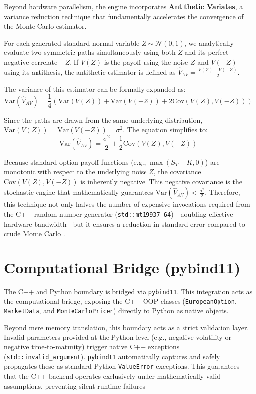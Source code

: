 Beyond hardware parallelism, the engine incorporates \textbf{Antithetic Variates}, a variance reduction technique that fundamentally accelerates the convergence of the Monte Carlo estimator.

For each generated standard normal variable \(Z \sim \mathcal{N}(0,1)\), we analytically evaluate two symmetric paths simultaneously using both \(Z\) and its perfect negative correlate \(-Z\). If \(V(Z)\) is the payoff using the noise \(Z\) and \(V(-Z)\) using its antithesis, the antithetic estimator is defined as \(\hat{V}_{AV} = \frac{V(Z) + V(-Z)}{2}\).

The variance of this estimator can be formally expanded as:
\begin{equation}
\text{Var}(\hat{V}_{AV}) = \frac{1}{4} \left( \text{Var}(V(Z)) + \text{Var}(V(-Z)) + 2\text{Cov}(V(Z), V(-Z)) \right)
\end{equation}

Since the paths are drawn from the same underlying distribution, \(\text{Var}(V(Z)) = \text{Var}(V(-Z)) = \sigma^2\). The equation simplifies to:
\begin{equation}
\text{Var}(\hat{V}_{AV}) = \frac{\sigma^2}{2} + \frac{1}{2}\text{Cov}(V(Z), V(-Z))
\end{equation}

Because standard option payoff functions (e.g., \(\max(S_T - K, 0)\)) are monotonic with respect to the underlying noise \(Z\), the covariance \(\text{Cov}(V(Z), V(-Z))\) is inherently negative. This negative covariance is the stochastic engine that mathematically guarantees \(\text{Var}(\hat{V}_{AV}) < \frac{\sigma^2}{2}\). Therefore, this technique not only halves the number of expensive invocations required from the C++ random number generator (\texttt{std::mt19937\_64})---doubling effective hardware bandwidth---but it ensures a reduction in standard error compared to crude Monte Carlo \cite{glasserman2004monte}.

\section{Computational Bridge (pybind11)}

The C++ and Python boundary is bridged via \texttt{pybind11}. This integration acts as the computational bridge, exposing the C++ OOP classes (\texttt{EuropeanOption}, \texttt{MarketData}, and \texttt{MonteCarloPricer}) directly to Python as native objects.

Beyond mere memory translation, this boundary acts as a strict validation layer. Invalid parameters provided at the Python level (e.g., negative volatility or negative time-to-maturity) trigger native C++ exceptions (\texttt{std::invalid\_argument}). \texttt{pybind11} automatically captures and safely propagates these as standard Python \texttt{ValueError} exceptions. This guarantees that the C++ backend operates exclusively under mathematically valid assumptions, preventing silent runtime failures.

